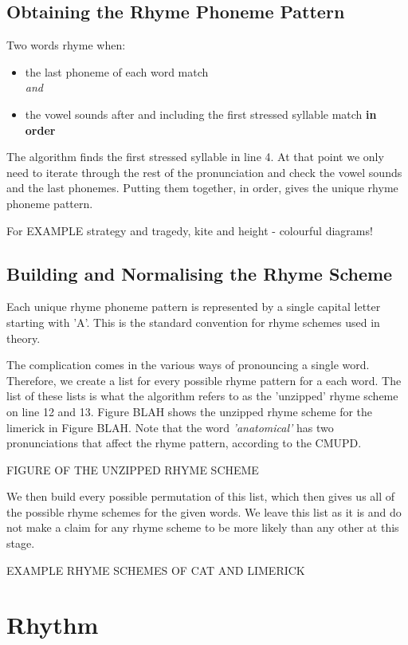 \subsection{Obtaining the Rhyme Phoneme Pattern}

Two words rhyme when:
\begin{itemize}
\item{the last phoneme of each word match \\\textit{and}}
\item{the vowel sounds after and including the first stressed syllable match \textbf{in order}}
\end{itemize}

The algorithm finds the first stressed syllable in line 4. At that point we only need to iterate through the rest of the pronunciation and check the vowel sounds and the last phonemes. Putting them together, in order, gives the unique rhyme phoneme pattern. 

For EXAMPLE strategy and tragedy, kite and height - colourful diagrams!			

\subsection{Building and Normalising the Rhyme Scheme}

Each unique rhyme phoneme pattern is represented by a single capital letter starting with 'A'. This is the standard convention for rhyme schemes used in theory. 

The complication comes in the various ways of pronouncing a single word. Therefore, we create a list for every possible rhyme pattern for a each word. The list of these lists is what the algorithm refers to as the 'unzipped' rhyme scheme on line 12 and 13. Figure BLAH shows the unzipped rhyme scheme for the limerick in Figure BLAH. Note that the word \textit{'anatomical'} has two pronunciations that affect the rhyme pattern, according to the CMUPD.

FIGURE OF THE UNZIPPED RHYME SCHEME

We then build every possible permutation of this list, which then gives us all of the possible rhyme schemes for the given words. We leave this list as it is and do not make a claim for any rhyme scheme to be more likely than any other at this stage.

EXAMPLE RHYME SCHEMES OF CAT AND LIMERICK

\section{Rhythm}

